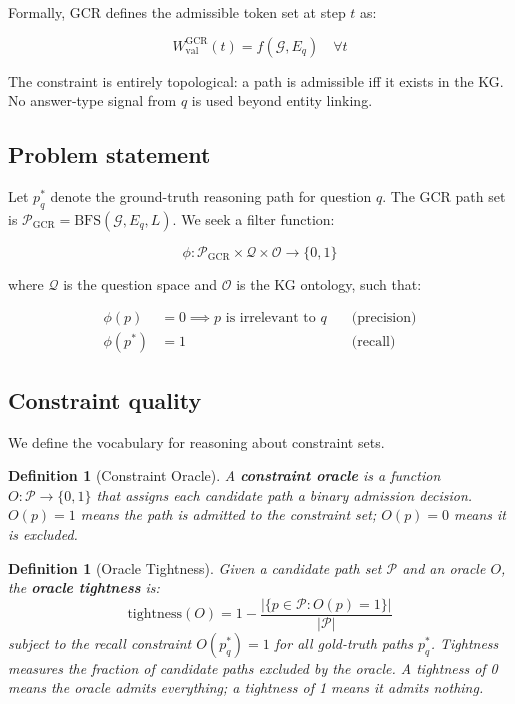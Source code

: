 \documentclass[11pt,twoside]{article}
\newtheorem{definition}[theorem]{Definition}
\begin{document}
Formally, GCR defines the admissible token set at step \(t\) as:

\[
	W^{\text{GCR}}_{\text{val}}(t) = f(\mathcal{G}, E_q) \quad \forall t
\]

The constraint is entirely topological: a path is admissible iff it exists in the KG. No answer-type signal from \(q\) is used beyond entity linking.

\subsection{Problem statement}

Let \(p^*_q\) denote the ground-truth reasoning path for question \(q\). The GCR path set is \(\mathcal{P}_{\text{GCR}} = \text{BFS}(\mathcal{G}, E_q, L)\). We seek a filter function:

\[
	\phi: \mathcal{P}_{\text{GCR}} \times \mathcal{Q} \times \mathcal{O} \to \{0, 1\}
\]

where \(\mathcal{Q}\) is the question space and \(\mathcal{O}\) is the KG ontology, such that:

\begin{align}
	\phi(p)   & = 0 \implies p \text{ is irrelevant to } q \quad & \text{(precision)} \\
	\phi(p^*) & = 1 \quad                                        & \text{(recall)}
\end{align}

\subsection{Constraint quality}

We define the vocabulary for reasoning about constraint sets.

\begin{definition}[Constraint Oracle]
	A \textbf{constraint oracle} is a function \(O: \mathcal{P} \to \{0, 1\}\) that assigns each candidate path a binary admission decision. \(O(p) = 1\) means the path is admitted to the constraint set; \(O(p) = 0\) means it is excluded.
\end{definition}

\begin{definition}[Oracle Tightness]
	Given a candidate path set \(\mathcal{P}\) and an oracle \(O\), the \textbf{oracle tightness} is:
	\[
		\text{tightness}(O) = 1 - \frac{|\{p \in \mathcal{P} : O(p) = 1\}|}{|\mathcal{P}|}
	\]
	subject to the recall constraint \(O(p^*_q) = 1\) for all gold-truth paths \(p^*_q\). Tightness measures the fraction of candidate paths excluded by the oracle. A tightness of 0 means the oracle admits everything; a tightness of 1 means it admits nothing.
\end{definition}
\end{document}

